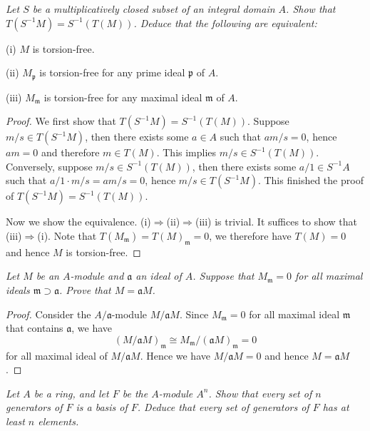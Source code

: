 \begin{problem}\em
Let $S$ be a multiplicatively closed subset of an integral domain $A$. Show that $T(S^{-1}M)=S^{-1}(T(M))$. Deduce that the following are equivalent: \par
(i) $M$ is torsion-free.\par
(ii) $M_\mathfrak{p}$ is torsion-free for any prime ideal $\mathfrak{p}$ of $A$.\par
(iii) $M_\mathfrak{m}$ is torsion-free for any maximal ideal $\mathfrak{m}$ of $A$.
\end{problem}
\begin{proof}
We first show that $T(S^{-1}M)=S^{-1}(T(M))$. Suppose $m/s\in T(S^{-1}M)$, then there exists some $a\in A$ such that $am/s=0$, hence $am=0$ and therefore $m\in T(M)$. This implies $m/s\in S^{-1}(T(M))$. Conversely, suppose $m/s\in S^{-1}(T(M))$, then there exists some $a/1\in S^{-1}A$ such that $a/1\cdot m/s=am/s=0$, hence $m/s\in T(S^{-1}M)$. This finished the proof of $T(S^{-1}M)=S^{-1}(T(M))$.\par
Now we show the equivalence. (i)$\Rightarrow$(ii)$\Rightarrow$(iii) is trivial. It suffices to show that (iii)$\Rightarrow$(i). Note that $T\left( M_{\mathfrak{m}} \right) =T\left( M \right) _{\mathfrak{m}}=0$, we therefore have $T(M)=0$ and hence $M$ is torsion-free.
\end{proof}
\begin{problem}\em
Let $M$ be an $A$-module and $\mathfrak{a}$ an ideal of $A$. Suppose that $M_\mathfrak{m}=0$ for all maximal ideals $\mathfrak{m}\supset\mathfrak{a}$. Prove that $M=\mathfrak{a}M$.
\end{problem}
\begin{proof}
Consider the $A/\mathfrak{a}$-module $M/\mathfrak{a}M$. Since $M_\mathfrak{m}=0$ for all maximal ideal $\mathfrak{m}$ that contains $\mathfrak{a}$, we have 
$$
\left( M/\mathfrak{a} M \right) _{\mathfrak{m}}\cong M_{\mathfrak{m}}/\left( \mathfrak{a} M \right) _{\mathfrak{m}}=0
$$
for all maximal ideal of $M/\mathfrak{a}M$. Hence we have $M/\mathfrak{a}M=0$ and hence $M=\mathfrak{a}M$.
\end{proof}
\begin{problem}\em
Let $A$ be a ring, and let $F$ be the $A$-module $A^n$. Show that every set of $n$ generators of $F$ is a basis of $F$. Deduce that every set of generators of $F$ has at least $n$ elements.
\end{problem}

